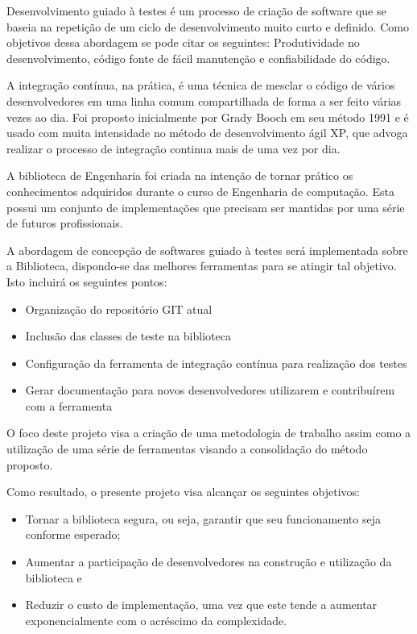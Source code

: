 \documentclass[
	article,			%
	12pt,				%
	oneside,			%
	a4paper,			%
	english,			
	brazil,
	sumario=tradicional
	]{abntex2}
\begin{document}
Desenvolvimento guiado à testes é um processo de criação de software
que se baseia na repetição de um ciclo de desenvolvimento muito curto e definido.
Como objetivos dessa abordagem se pode citar os seguintes: Produtividade no desenvolvimento,
código fonte de fácil manutenção e confiabilidade do código.

A integração contínua, na prática, é uma técnica de mesclar o código de vários desenvolvedores em uma linha comum compartilhada de forma a ser feito várias vezes ao dia. Foi proposto inicialmente por Grady Booch em seu método 1991 e é usado com muita intensidade no método de desenvolvimento ágil XP, que advoga realizar o processo de integração continua mais de uma vez por dia.

A biblioteca de Engenharia foi criada na intenção de tornar prático os conhecimentos adquiridos durante o curso de Engenharia de computação. Esta possui um conjunto de implementações que precisam ser mantidas por uma série de futuros profissionais.

A abordagem de concepção de softwares guiado à testes será implementada sobre a Biblioteca, dispondo-se das melhores ferramentas para se atingir tal objetivo. Isto incluirá os seguintes pontos:

\begin{itemize}
	\item{Organização do repositório GIT atual}
	\item{Inclusão das classes de teste na biblioteca}
	\item{Configuração da ferramenta de integração contínua para realização dos testes}
	\item{Gerar documentação para novos desenvolvedores utilizarem e contribuírem com a ferramenta}
\end{itemize}

O foco deste projeto visa a criação de uma metodologia de trabalho assim como a utilização de uma série de ferramentas visando a consolidação do método proposto.

Como resultado, o presente projeto visa alcançar os seguintes objetivos:
\begin{itemize}
	\item{Tornar a biblioteca segura, ou seja, garantir que seu funcionamento seja conforme esperado;}
	\item{Aumentar a participação de desenvolvedores na construção e utilização da biblioteca e}
	\item{Reduzir o custo de implementação, uma vez que este tende a aumentar exponencialmente com o acréscimo da complexidade.}
\end{itemize}
\end{document}
